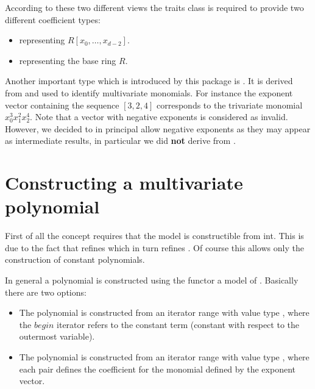 According to these two different views the traits class is required to provide 
two different coefficient types:
\begin{itemize}
\item {} 
representing $R[x_0,\dots,x_{d-2}]$.
\item {} 
representing the base ring $R$.
\end{itemize}

Another important type which is introduced by this package is 
. 
It is derived from  and used to identify multivariate 
monomials. For instance the exponent vector containing the sequence 
$[3,2,4]$ corresponds to the trivariate monomial $x_0^3x_1^2x_2^4$. 
Note that a vector with negative exponents is considered as invalid. 
However, we decided to in principal allow negative exponents as they may 
appear as intermediate results, in particular we did {\bf not} derive from 
. 


\section{Constructing a multivariate polynomial}

First of all the concept  requires that the model is 
constructible from int. This is due to the fact that  
refines  which in turn refines 
. Of course this allows only the construction of 
constant polynomials. 

In general a polynomial is constructed using the functor 
 a model of 
.  Basically there are two options:
\begin{itemize}
\item The polynomial is constructed from an iterator range with value type 
, 
where the $begin$ iterator refers to the constant term 
(constant with respect to the outermost variable). 
\item The polynomial is constructed from an iterator range with value type 
,
where each pair defines the coefficient for the monomial defined by 
the exponent vector. 
\end{itemize}

